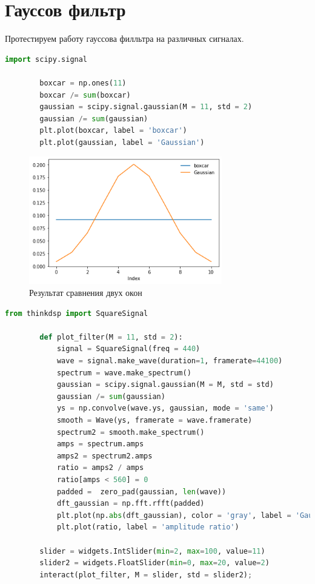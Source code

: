 \documentclass[a4paper, 12pt]{report}
\begin{document}
	\chapter{Гауссов фильтр}
	Протестируем работу гауссова филльтра на различных сигналах.
	\begin{lstlisting}[language=Python,caption=Прямоугольное и гауссово окна]
		import scipy.signal		

		boxcar = np.ones(11)
		boxcar /= sum(boxcar)
		gaussian = scipy.signal.gaussian(M = 11, std = 2)
		gaussian /= sum(gaussian)
		plt.plot(boxcar, label = 'boxcar')
		plt.plot(gaussian, label = 'Gaussian')
	\end{lstlisting}
	\begin{figure}[H]
		\centering
		\includegraphics[width=0.75\textwidth]{test10.png}
		\caption{Результат сравнения двух окон}
		\label{fig:test10}
	\end{figure}
	\begin{lstlisting}[language=Python,caption=Собрали всё в одну функцию]
		from thinkdsp import SquareSignal

		def plot_filter(M = 11, std = 2):
			signal = SquareSignal(freq = 440)
			wave = signal.make_wave(duration=1, framerate=44100)
			spectrum = wave.make_spectrum()
			gaussian = scipy.signal.gaussian(M = M, std = std)
			gaussian /= sum(gaussian)
			ys = np.convolve(wave.ys, gaussian, mode = 'same')
			smooth = Wave(ys, framerate = wave.framerate)
			spectrum2 = smooth.make_spectrum()
			amps = spectrum.amps
			amps2 = spectrum2.amps
			ratio = amps2 / amps    
			ratio[amps < 560] = 0
			padded =  zero_pad(gaussian, len(wave))
			dft_gaussian = np.fft.rfft(padded)		
			plt.plot(np.abs(dft_gaussian), color = 'gray', label = 'Gaussian filter')
			plt.plot(ratio, label = 'amplitude ratio')

		slider = widgets.IntSlider(min=2, max=100, value=11)
		slider2 = widgets.FloatSlider(min=0, max=20, value=2)
		interact(plot_filter, M = slider, std = slider2);
	\end{lstlisting}
\end{document}
